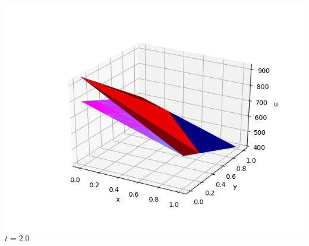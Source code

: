 \documentclass[]{beamer}
\begin{document}
\begin{frame}[t]
\begin{columns}
\begin{center}
			\includegraphics[scale=0.2]{figures/2D_xy_h1m/2D_xy_homog1mat_u_vs_x_20}\\
			$t=2.0$ \normalsize
			\end{center}
	\end{columns}
\end{frame}
\end{document}
